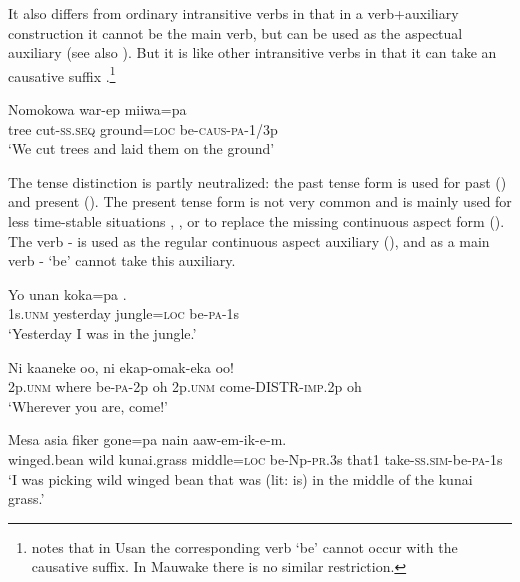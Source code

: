 It also differs from ordinary intransitive verbs in that in a verb+auxiliary construction it cannot be the main verb, but can be used as the aspectual auxiliary  (see also ). But it is like other intransitive verbs in that it can take an causative suffix .\footnote{\citet[142]{Reesink1987} notes that in Usan the corresponding verb  `be' cannot occur with the causative suffix. In Mauwake there is no similar restriction.} 

\ea%
\label{ex:3:x261}
\gll Nomokowa war-ep miiwa=pa  \\
tree cut-\textsc{ss}.\textsc{seq} ground=\textsc{loc} be-\textsc{caus}-\textsc{pa}-1/3p\\
\glt`We cut trees and laid them on the ground' 
\z

The tense distinction is partly neutralized: the past tense form is used for past () and present (). The present tense form is not very common and is mainly used for less time-stable situations , , or to replace the missing continuous aspect form (). The verb - is used as the regular continuous aspect auxiliary (), and as a main verb - `be' cannot take this auxiliary. 

\ea%
\label{ex:3:x263}
\gll Yo unan koka=pa . \\
1s.\textsc{unm} yesterday jungle=\textsc{loc} be-\textsc{pa}-1s \\
\glt`Yesterday I was in the jungle.' 
\z

\ea%
\label{ex:3:x264}
\gll Ni kaaneke  oo, ni ekap-omak-eka oo! \\
2p.\textsc{unm} where be-\textsc{pa}-2p oh 2p.\textsc{unm} come-DISTR-\textsc{imp}.2p oh \\
\glt`Wherever you are, come!'
\z

\ea%
\label{ex:3:x1028}
\gll Mesa asia fiker gone=pa  nain aaw-em-ik-e-m.\\
winged.bean wild kunai.grass middle=\textsc{loc} be-Np-\textsc{pr}.3s that1 take-\textsc{ss}.\textsc{sim}-be-\textsc{pa}-1s\\
\glt`I was picking wild winged bean that was (lit: is) in the middle of the kunai grass.'
\z

